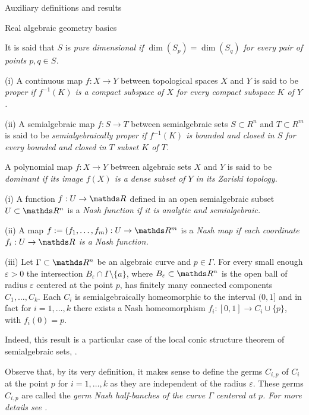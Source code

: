 \documentclass[11pt, a4paper, english, twoside, notitlepage, openright]{report}
\begin{document}
\begin{chapter}{Auxiliary definitions and results}
\begin{section}{Real algebraic geometry basics}
\begin{definition}
	It is said that $S$ is \em pure dimensional \em if $\dim(S_p)=\dim(S_q)$ for every pair of points $p,q\in S$.
\end{definition}

\begin{definitions}\label{properMap}
	  (i) A continuous map $f:X\to Y$ between topological spaces $X$ and $Y$ is said to be \em proper \em if $f^{-1}(K)$ is a compact subspace of $X$ for every compact subspace $K$ of $Y$. 
	  
	  (ii) A semialgebraic map $f:S\to T$ between semialgebraic sets $S\subset R^n$ and $T\subset R^m$ is said to be \em semialgebraically proper \em if $f^{-1}(K)$ is bounded and closed in $S$ for every bounded and closed in $T$ subset $K$ of $T$.  
\end{definitions}

\begin{definition}\label{dominant}
	A polynomial map $f:X\to Y$ between algebraic sets $X$ and $Y$ is said to be \em dominant \em if its image $f(X)$ is a dense subset of $Y$ in its Zariski topology. 
\end{definition}

\begin{definitions}\label{curveGerms}
	(i) A function $f:U\to\R$ defined in an open semialgebraic subset $U\subset\R^n$ is a \em Nash function \em if it is analytic and semialgebraic. 
	
	(ii) A map $f:=(f_1,\dots,f_m):U\to\R^m$ is a \em Nash map \em if each coordinate $f_i:U\to\R$ is a Nash function. 
	
	(iii) Let $\Gamma\subset\R^n$ be an algebraic curve and $p\in\Gamma$. For every small enough $\varepsilon>0$ the intersection $B_{\varepsilon}\cap\Gamma\setminus\{a\}$, %
where $B_{\varepsilon}\subset\R^n$ is the open ball of radius $\varepsilon$ centered at the point $p$, has finitely many connected components $C_1,\dots,C_k$. Each $C_i$ is semialgebraically homeomorphic to the interval $(0,1]$ and in fact for $i=1,\dots,k$ there exists a Nash homeomorphism  $f_i:[0,1]\to C_i\cup\{p\}$, with $f_i(0)=p$.

Indeed, this result is a particular case of the local conic structure theorem of semialgebraic sets, \cite[IX.3.6]{bcr}. 
	
Observe that, by its very definition, it makes sense to define the germs $C_{i,p}$ of $C_i$ at the point $p$ for $i=1,\dots,k$ as they are independent of the radius $\varepsilon$. These germs  $C_{i,p}$ are called the \em germ Nash half-banches \em of the curve $\Gamma$ centered at $p$. For more details see \cite[IX.5.2]{bcr}. 
\end{definitions}


\end{section}
\end{chapter}
\end{document}
